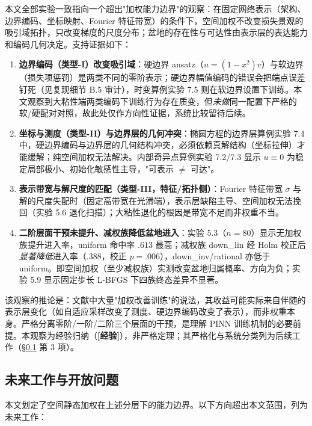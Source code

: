 \documentclass[fontset=windows,11pt]{ctexart}
\numberwithin{equation}{section}
\begin{document}
本文全部实验一致指向一个超出"加权能力边界"的观察：在固定网络表示（架构、边界编码、坐标映射、Fourier 特征带宽）的条件下，空间加权不改变损失景观的吸引域拓扑，只改变梯度的尺度分布；盆地的存在性与可达性由表示层的表达能力和编码几何决定。支持证据如下：

\begin{enumerate}[label=(\arabic*),leftmargin=2em,itemsep=1pt]
\item \textbf{边界编码（类型-I）改变吸引域}：硬边界 ansatz（$u=(1-x^2)v$）与软边界（损失项惩罚）是两类不同的零阶表示；硬边界幅值编码的错误会把端点误差钉死（见复现细节 B.5 审计），时变算例实验 7.5 则在软边界设置下训练。本文观察到大粘性端两类编码下训练行为存在质变，但\emph{未做}同一配置下严格的软/硬配对对照，故此处仅作方向性证据，系统比较留待后续。
\item \textbf{坐标与测度（类型-II）与边界层的几何冲突}：椭圆方程的边界层算例实验 7.4 中，硬边界编码与边界层的几何结构冲突，必须依赖真解结构（坐标拉伸）才能缓解；纯空间加权无法解决。内部奇异点算例实验 7.2/7.3 显示 $u\equiv0$ 为稳定局部极小、初始化敏感性主导，"可表示 $\neq$ 可达"。
\item \textbf{表示带宽与解尺度的匹配（类型-III，特征/拓扑侧）}：Fourier 特征带宽 $\sigma$ 与解的尺度失配时（固定高带宽在光滑端），表示层缺陷主导、空间加权无法挽回（实验 5.6 退化扫描）；大粘性退化的根因是带宽不足而非权重不当。
\item \textbf{二阶层面干预未提升、减权族降低盆地进入}：实验 5.3（$n=80$）显示无加权族提升进入率，uniform 命中率 $.613$ 最高；减权族 down\_lin 经 Holm 校正后\emph{显著降低}进入率（$.388$，校正 $p=.006$），down\_inv/rational 亦低于 uniform。即空间加权（至少减权族）实测改变盆地归属概率、方向为负；实验 5.9 显示固定步长 L-BFGS 下四族终态差异不显著。
\end{enumerate}

该观察的推论是：文献中大量"加权改善训练"的说法，其收益可能实际来自伴随的表示层变化（如自适应采样改变了测度、硬边界编码改变了表示），而非权重本身。严格分离零阶/一阶/二阶三个层面的干预，是理解 PINN 训练机制的必要前提。本观察为经验归纳（\textbf{[经验]}），非严格定理；其严格化与系统分类列为后续工作（\S\ref{sec:future} 第 3 项）。

\subsection{未来工作与开放问题}\label{sec:future}

本文划定了空间静态加权在上述分层下的能力边界。以下方向超出本文范围，列为未来工作：
\end{document}
